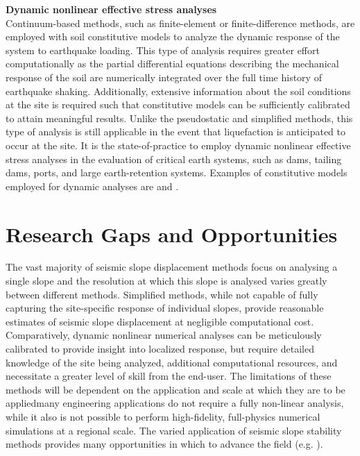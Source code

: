 \noindent\textbf{Dynamic nonlinear effective stress analyses} \\
Continuum-based methods, such as finite-element or finite-difference methods, are employed with soil constitutive models to analyze the dynamic response of the system to earthquake loading. This type of analysis requires greater effort computationally as the partial differential equations describing the mechanical response of the soil are numerically integrated over the full time history of earthquake shaking. Additionally, extensive information about the soil conditions at the site is required such that constitutive models can be sufficiently calibrated to attain meaningful results. Unlike the pseudostatic and simplified methods, this type of analysis is still applicable in the event that liquefaction is anticipated to occur at the site. It is the state-of-practice to employ dynamic nonlinear effective stress analyses in the evaluation of critical earth systems, such as dams, tailing dams, ports, and large earth-retention systems. Examples of constitutive models employed for dynamic analyses are \cite{yang2003computational, byrne2004numerical, boulanger2017pm4sand} and \cite{boulanger2018pm4silt}.

\section{Research Gaps and Opportunities}
\label{sec:eq_landslide_research}
The vast majority of seismic slope displacement methods focus on analysing a single slope and the resolution at which this slope is analysed varies greatly between different methods. Simplified methods, while not capable of fully capturing the site-specific response of individual slopes, provide reasonable estimates of seismic slope displacement at negligible computational cost. Comparatively, dynamic nonlinear numerical analyses can be meticulously calibrated to provide insight into localized response, but require detailed knowledge of the site being analyzed, additional computational resources, and necessitate a greater level of skill from the end-user. The limitations of these methods will be dependent on the application and scale at which they are to be applied\textemdash many engineering applications do not require a fully non-linear analysis, while it also is not possible to perform high-fidelity, full-physics numerical simulations at a regional scale. The varied application of seismic slope stability methods provides many opportunities in which to advance the field (e.g. \cite{brayusnewzealand2017}).

